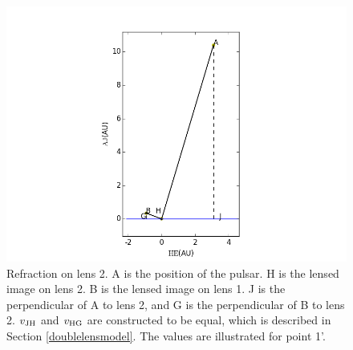 \documentclass[useAMS,usenatbib]{mn2e}
\begin{document}
\begin{figure}
\centering
\includegraphics[width=1.0\linewidth,scale=1.0]{First_reflection.png}
\caption{Refraction on lens 2. 
A is the position of the pulsar. H is the lensed image on lens 2. B is
the lensed image on lens 1. J is the perpendicular of A to lens 2, and
G is the perpendicular of B to lens 2. $v_{\rm JH}$ and $v_{\rm HG}$
are constructed to be equal, which is described in Section
\ref{doublelensmodel}. The values are illustrated for point 1'.}
\label{first_reflect}
\end{figure}
\end{document}
